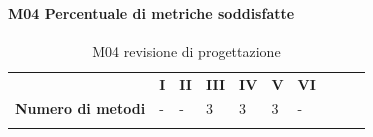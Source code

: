 \paragraph{M04 Percentuale di metriche soddisfatte} \mbox{}
\begin{longtable}[H!] {						
		>{}p{50mm}  		
		>{}p{8mm}
		>{}p{8mm}		
		>{}p{8mm}		
		>{}p{8mm}		
		>{}p{8mm}		
		>{}p{8mm}
		>{}p{8mm}
		>{}p{8mm}
		>{}p{8mm}
	}
	\rowcolor{gray!50}
	\textbf{} & \textbf{I} & \textbf{II} & \textbf{III} & \textbf{IV} & \textbf{V} & \textbf{VI} \TBstrut \\ [2mm]
	\textbf{Numero di metodi} & - & - & 3 & 3 & 3 & - \TBstrut \\ [2mm]
	\rowcolor{white}
	\caption{M04 revisione di progettazione\glo}
\end{longtable}


















